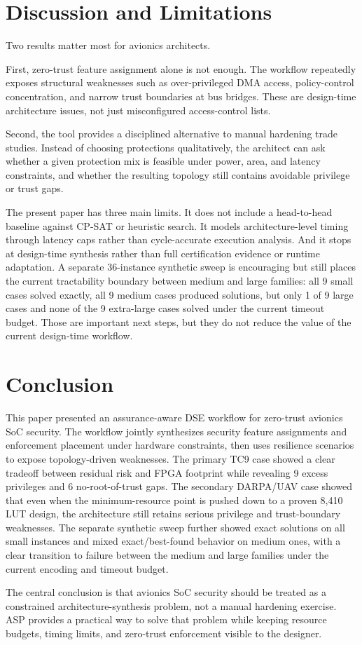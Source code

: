 \documentclass[conference]{IEEEtran}
\begin{document}
\section{Discussion and Limitations}

Two results matter most for avionics architects.

First, zero-trust feature assignment alone is not enough. The workflow
repeatedly exposes structural weaknesses such as over-privileged DMA access,
policy-control concentration, and narrow trust boundaries at bus bridges.
These are design-time architecture issues, not just misconfigured
access-control lists.

Second, the tool provides a disciplined alternative to manual hardening trade
studies. Instead of choosing protections qualitatively, the architect can ask
whether a given protection mix is feasible under power, area, and latency
constraints, and whether the resulting topology still contains avoidable
privilege or trust gaps.

The present paper has three main limits. It does not include a head-to-head
baseline against CP-SAT or heuristic search. It models architecture-level
timing through latency caps rather than cycle-accurate execution analysis.
And it stops at design-time synthesis rather than full certification evidence
or runtime adaptation. A separate 36-instance synthetic sweep is encouraging
but still places the current tractability boundary between medium and large
families: all 9 small cases solved exactly, all 9 medium cases produced
solutions, but only 1 of 9 large cases and none of the 9 extra-large cases
solved under the current timeout budget. Those are important next steps, but
they do not reduce the value of the current design-time workflow.

\section{Conclusion}

This paper presented an assurance-aware DSE workflow for zero-trust avionics
SoC security. The workflow jointly synthesizes security feature assignments
and enforcement placement under hardware constraints, then uses resilience
scenarios to expose topology-driven weaknesses. The primary TC9 case showed a
clear tradeoff between residual risk and FPGA footprint while revealing 9
excess privileges and 6 no-root-of-trust gaps. The secondary DARPA/UAV case
showed that even when the minimum-resource point is pushed down to a proven
8,410 LUT design, the architecture still retains serious privilege and
trust-boundary weaknesses. The separate synthetic sweep further showed exact
solutions on all small instances and mixed exact/best-found behavior on
medium ones, with a clear transition to failure between the medium and large
families under the current encoding and timeout budget.

The central conclusion is that avionics SoC security should be treated as a
constrained architecture-synthesis problem, not a manual hardening exercise.
ASP provides a practical way to solve that problem while keeping resource
budgets, timing limits, and zero-trust enforcement visible to the designer.

\balance


\end{document}
